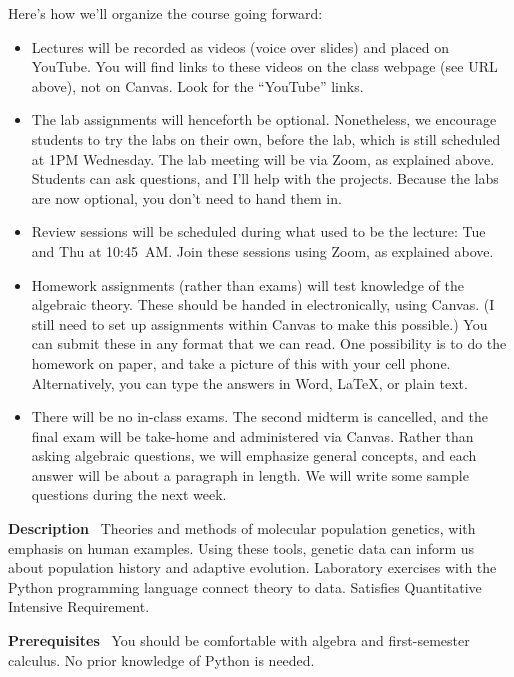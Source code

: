 \documentclass[11pt]{article}
\newcommand{\heading}[1]{\bigskip\noindent\textbf{#1}~}
\begin{document}
Here's how we'll organize the course going forward:
\begin{itemize}
  \item Lectures will be recorded as videos (voice over slides) and
    placed on YouTube. You will find links to these videos on the
    class webpage (see URL above), not on Canvas. Look for the
    ``YouTube'' links.

  \item The lab assignments will henceforth be optional. Nonetheless,
    we encourage students to try the labs on their own, before the
    lab, which is still scheduled at 1PM Wednesday. The lab meeting
    will be via Zoom, as explained above. Students can ask questions,
    and I'll help with the projects. Because the labs are now
    optional, you don't need to hand them in.
    
  \item Review sessions will be scheduled during what used to be the
    lecture: Tue and Thu at 10:45~AM. Join these sessions using Zoom,
    as explained above.

  \item Homework assignments (rather than exams) will test knowledge
    of the algebraic theory. These should be handed in electronically,
    using Canvas. (I still need to set up assignments within Canvas to
    make this possible.) You can submit these in any format that we
    can read. One possibility is to do the homework on paper, and take
    a picture of this with your cell phone. Alternatively, you can
    type the answers in Word, LaTeX, or plain text.

  \item There will be no in-class exams. The second midterm is
    cancelled, and the final exam will be take-home and administered
    via Canvas. Rather than asking algebraic questions, we will
    emphasize general concepts, and each answer will be about a
    paragraph in length. We will write some sample questions during
    the next week.
\end{itemize}

\heading{Description} Theories and methods of molecular population
genetics, with emphasis on human examples. Using these tools, genetic
data can inform us about population history and adaptive
evolution. Laboratory exercises with the Python programming language
connect theory to data. Satisfies Quantitative Intensive Requirement.

\heading{Prerequisites} You should be comfortable with algebra and
first-semester calculus.  No prior knowledge of Python is
needed.
\end{document}
